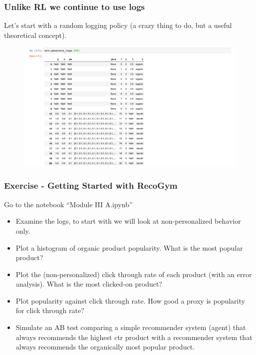    \begin{frame}
    \frametitle{Unlike RL we continue to use logs}
   
    Let's start with a random logging policy (a crazy thing to do, but a useful theoretical concept).
    
     \begin{figure}[h!]
       \includegraphics[scale=0.3]{images/recogymlog.png}
         \centering
         \label{motex1}
     \end{figure}
  \end{frame}


  \begin{frame}
    \frametitle{Exercise - Getting Started with RecoGym}

    Go to the notebook ``Module III A.ipynb''
\begin{itemize}
  \item Examine the logs, to start with we will look at non-personalized behavior only.
  \item Plot a histogram of organic product popularity. What is the most popular product?  
  \item Plot the (non-personalized) click through rate of each product (with an error analysis).  What is the most clicked-on product?
  \item Plot popularity against click through rate.  How good a proxy is popularity for click through rate?
  \item Simulate an AB test comparing a simple recommender system (agent) that always recommends the highest ctr product with a recommender system that always recommends the organically most popular product.
\end{itemize}
\end{frame}

